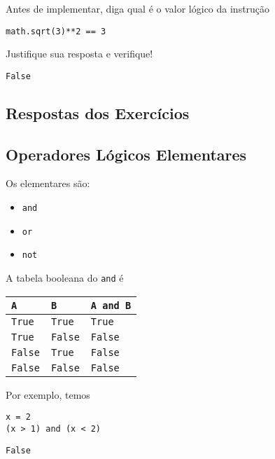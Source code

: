 \begin{exer}
  Antes de implementar, diga qual é o valor lógico da instrução

\begin{lstlisting}
math.sqrt(3)**2 == 3
\end{lstlisting}

Justifique sua resposta e verifique!
\end{exer}
\begin{resp}
\texttt{False}
\end{resp}

\ifisbook 
\subsection*{Respostas dos Exercícios}
\shipoutAnswer
\fi

\subsection{Operadores Lógicos Elementares}

Os  elementares são:
\begin{itemize}
\item[]\texttt{and} 
\item[]\texttt{or} 
\item[]\texttt{not} 
\end{itemize}

\begin{ex}
  A tabela booleana{\boole} do \texttt{and} é
  \begin{center}
    \begin{tabular}[H]{ll|l}
      \texttt{A} & \texttt{B} & \texttt{A and B}\\\hline
      \texttt{True} & \texttt{True} & \texttt{True} \\
      \texttt{True} & \texttt{False} & \texttt{False} \\
      \texttt{False} & \texttt{True} & \texttt{False} \\
      \texttt{False} & \texttt{False} & \texttt{False} \\\hline
    \end{tabular}
  \end{center}

  Por exemplo, temos

\begin{lstlisting}
x = 2
(x > 1) and (x < 2)
\end{lstlisting}

\begin{verbatim}
False
\end{verbatim}

\end{ex}

